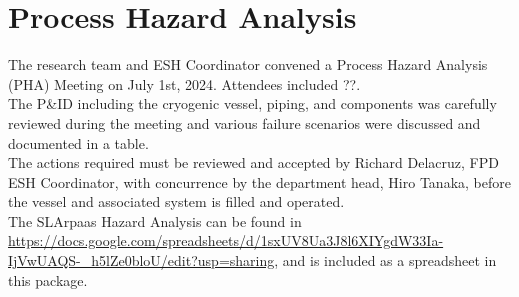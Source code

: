\section{Process Hazard Analysis}
\label{sec:hazard_ana}

The research team and ESH Coordinator convened a Process Hazard Analysis (PHA) 
Meeting on July 1st, 2024. 
Attendees included ??.\\

The P\&ID including the cryogenic vessel, piping, and components was carefully reviewed 
during the meeting and various failure scenarios were discussed and documented in a table.\\

The actions required must be reviewed and accepted by Richard Delacruz, FPD ESH Coordinator, 
with concurrence by the department head, Hiro Tanaka, before the vessel and associated 
system is filled and operated.\\

The SLArpaas Hazard Analysis can be found in
\url{https://docs.google.com/spreadsheets/d/1sxUV8Ua3J8l6XIYgdW33Ia-IjVwUAQS-_h5lZe0bloU/edit?usp=sharing},
and is included as a spreadsheet in this package.
